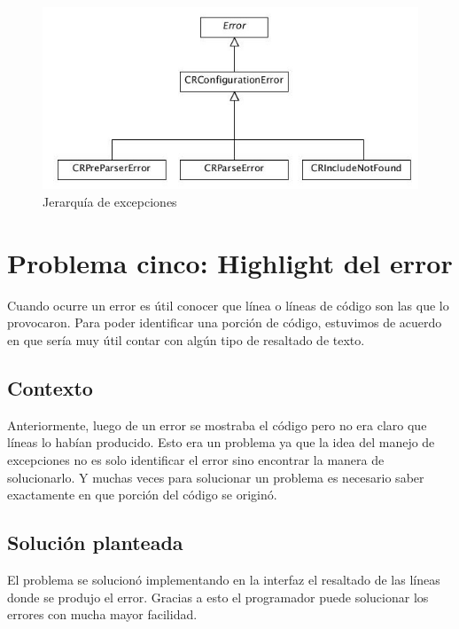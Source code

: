 \documentclass[a4paper,oneside,12pt]{article}
\begin{document}
\begin{figure}[h!]
  \centering
    \includegraphics[scale=0.6]{images/diagrama_clases_excepciones.jpg}
    \caption{Jerarqu\'ia de excepciones}
    \label{diagrama_clases_excepciones}
\end{figure}

\section{Problema cinco: Highlight del error}

Cuando ocurre un error es \'util conocer que l\'inea o l\'ineas de c\'odigo son las que lo provocaron. Para poder identificar una porci\'on de c\'odigo, estuvimos de acuerdo en que ser\'ia muy \'util contar con alg\'un tipo de resaltado de texto.

\subsection{Contexto}
Anteriormente, luego de un error se mostraba el c\'odigo pero no era claro que l\'ineas lo hab\'ian producido. Esto era un problema ya que la idea del manejo de excepciones no es solo identificar el error sino encontrar la manera de solucionarlo. Y muchas veces para solucionar un problema es necesario saber exactamente en que porci\'on del c\'odigo se origin\'o.

\subsection{Soluci\'on planteada}
El problema se solucion\'o implementando en la interfaz el resaltado de las l\'ineas donde se produjo el error. Gracias a esto el programador puede solucionar los errores con mucha mayor facilidad.
\end{document}
